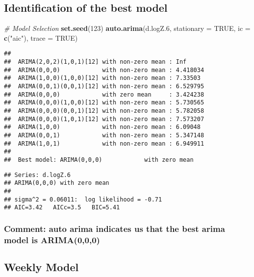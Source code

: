 \documentclass[
]{article}
\newenvironment{Shaded}{\begin{snugshade}}{\end{snugshade}}
\newcommand{\AttributeTok}[1]{\textcolor[rgb]{0.13,0.29,0.53}{#1}}
\newcommand{\CommentTok}[1]{\textcolor[rgb]{0.56,0.35,0.01}{\textit{#1}}}
\newcommand{\ConstantTok}[1]{\textcolor[rgb]{0.56,0.35,0.01}{#1}}
\newcommand{\DecValTok}[1]{\textcolor[rgb]{0.00,0.00,0.81}{#1}}
\newcommand{\FloatTok}[1]{\textcolor[rgb]{0.00,0.00,0.81}{#1}}
\newcommand{\FunctionTok}[1]{\textcolor[rgb]{0.13,0.29,0.53}{\textbf{#1}}}
\newcommand{\NormalTok}[1]{#1}
\newcommand{\StringTok}[1]{\textcolor[rgb]{0.31,0.60,0.02}{#1}}
\begin{document}
\hypertarget{identification-of-the-best-model-2}{%
\subsection{Identification of the best
model}\label{identification-of-the-best-model-2}}

\begin{Shaded}
\begin{Highlighting}[]
\CommentTok{\# Model Selection}
\FunctionTok{set.seed}\NormalTok{(}\DecValTok{123}\NormalTok{)}
\FunctionTok{auto.arima}\NormalTok{(d.logZ}\FloatTok{.6}\NormalTok{, }\AttributeTok{stationary =} \ConstantTok{TRUE}\NormalTok{, }\AttributeTok{ic =} \FunctionTok{c}\NormalTok{(}\StringTok{"aic"}\NormalTok{), }\AttributeTok{trace =} \ConstantTok{TRUE}\NormalTok{)}
\end{Highlighting}
\end{Shaded}

\begin{verbatim}
## 
##  ARIMA(2,0,2)(1,0,1)[12] with non-zero mean : Inf
##  ARIMA(0,0,0)            with non-zero mean : 4.418034
##  ARIMA(1,0,0)(1,0,0)[12] with non-zero mean : 7.33503
##  ARIMA(0,0,1)(0,0,1)[12] with non-zero mean : 6.529795
##  ARIMA(0,0,0)            with zero mean     : 3.424238
##  ARIMA(0,0,0)(1,0,0)[12] with non-zero mean : 5.730565
##  ARIMA(0,0,0)(0,0,1)[12] with non-zero mean : 5.782058
##  ARIMA(0,0,0)(1,0,1)[12] with non-zero mean : 7.573207
##  ARIMA(1,0,0)            with non-zero mean : 6.09048
##  ARIMA(0,0,1)            with non-zero mean : 5.347148
##  ARIMA(1,0,1)            with non-zero mean : 6.949911
## 
##  Best model: ARIMA(0,0,0)            with zero mean
\end{verbatim}

\begin{verbatim}
## Series: d.logZ.6 
## ARIMA(0,0,0) with zero mean 
## 
## sigma^2 = 0.06011:  log likelihood = -0.71
## AIC=3.42   AICc=3.5   BIC=5.41
\end{verbatim}

\hypertarget{comment-auto-arima-indicates-us-that-the-best-arima-model-is-arima000}{%
\subsubsection{Comment: auto arima indicates us that the best arima
model is
ARIMA(0,0,0)}\label{comment-auto-arima-indicates-us-that-the-best-arima-model-is-arima000}}

\hypertarget{weekly-model-1}{%
\subsection{Weekly Model}\label{weekly-model-1}}
\end{document}
